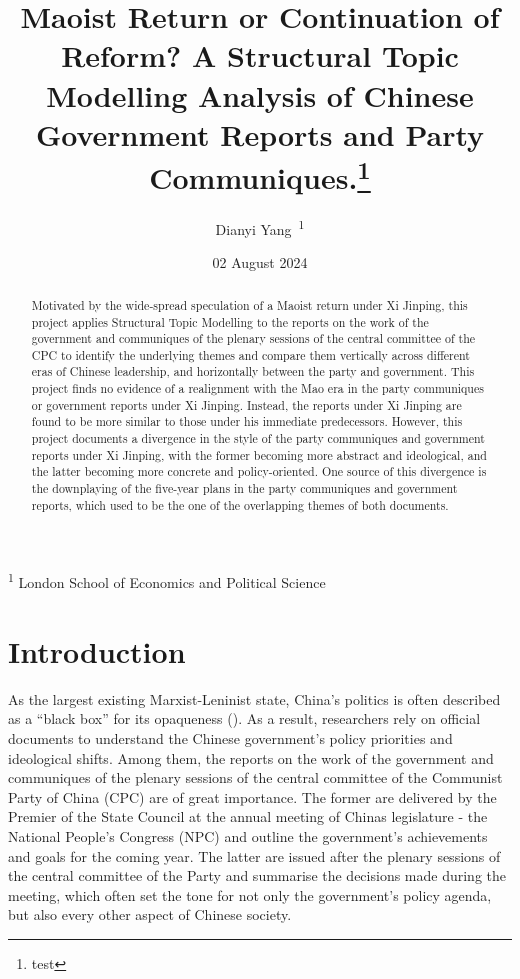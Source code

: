 \documentclass[
  letterpaper,
  abstract=true]{scrartcl}
\title{Maoist Return or Continuation of Reform? A Structural Topic
Modelling Analysis of Chinese Government Reports and Party
Communiques.\thanks{test}}
\author{Dianyi Yang~\orcidlink{0009-0004-4652-3429}\textsuperscript{1}}
\date{02 August 2024}
\begin{document}
\maketitle
\begin{abstract}
Motivated by the wide-spread speculation of a Maoist return under Xi
Jinping, this project applies Structural Topic Modelling to the reports
on the work of the government and communiques of the plenary sessions of
the central committee of the CPC to identify the underlying themes and
compare them vertically across different eras of Chinese leadership, and
horizontally between the party and government. This project finds no
evidence of a realignment with the Mao era in the party communiques or
government reports under Xi Jinping. Instead, the reports under Xi
Jinping are found to be more similar to those under his immediate
predecessors. However, this project documents a divergence in the style
of the party communiques and government reports under Xi Jinping, with
the former becoming more abstract and ideological, and the latter
becoming more concrete and policy-oriented. One source of this
divergence is the downplaying of the five-year plans in the party
communiques and government reports, which used to be the one of the
overlapping themes of both documents.
\end{abstract}




\textsuperscript{1} London School of Economics and Political Science

\newpage

\section{Introduction}\label{introduction}

As the largest existing Marxist-Leninist state, China's politics is
often described as a ``black box'' for its opaqueness
(). As a result,
researchers rely on official documents to understand the Chinese
government's policy priorities and ideological shifts. Among them, the
reports on the work of the government and communiques of the plenary
sessions of the central committee of the Communist Party of China (CPC)
are of great importance. The former are delivered by the Premier of the
State Council at the annual meeting of Chinas legislature - the National
People's Congress (NPC) and outline the government's achievements and
goals for the coming year. The latter are issued after the plenary
sessions of the central committee of the Party and summarise the
decisions made during the meeting, which often set the tone for not only
the government's policy agenda, but also every other aspect of Chinese
society.
\end{document}
